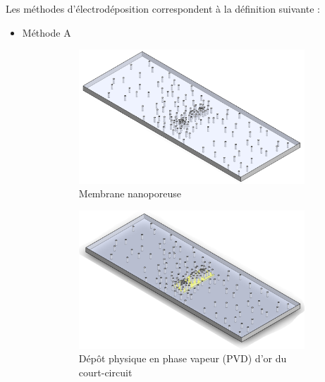 Les méthodes d'électrodéposition correspondent à la définition suivante :
\begin{itemize}
    \item Méthode A
          \begin{figure}[H]
              \hspace{-0.5cm}
              \begin{subfigure}{0.45\textwidth}
                  \includegraphics[scale = 0.3]{assets/figures/Membrane_nue.png}
                  \caption{Membrane nanoporeuse}
              \end{subfigure}
              \begin{subfigure}{0.45\textwidth}
                  \includegraphics[scale = 0.35]{assets/figures/Court_circuit.png}
                  \caption{Dépôt physique en phase vapeur (PVD) d'or du court-circuit}
              \end{subfigure}
              \newline
              \begin{subfigure}{0.45\textwidth}

\end{subfigure}
\end{figure}
\end{itemize}
